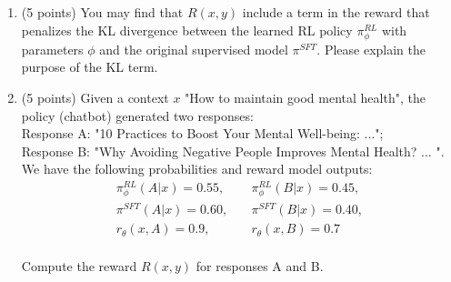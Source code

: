 \begin{enumerate}
\item (5 points) You may find that $R(x, y)$  include a term in the reward that penalizes the KL divergence between the learned RL policy $\pi_{\phi}^{RL}$ with parameters $\phi$ and the original
supervised model $\pi^{SFT}$. Please explain the purpose of the KL term.\\



\item (5 points) Given a context  $x$ "How to maintain good mental health", the policy (chatbot) generated two responses:\\
Response A: "10 Practices to Boost Your Mental Well-being: ...";\\
Response B: "Why Avoiding Negative People Improves Mental Health? ... ".\\
We have the following probabilities and reward model outputs:\\
\begin{align}
    \pi_{\phi}^{RL}(A|x) = 0.55, & \quad \pi_{\phi}^{RL}(B|x) = 0.45, \\\nonumber
    \pi^{SFT}(A|x) = 0.60, & \quad \pi^{SFT}(B|x) = 0.40 ,\\\nonumber
    r_\theta(x, A) = 0.9, & \quad  r_\theta(x, B) = 0.7 \\\nonumber  
\end{align}

Compute the reward $R(x,y)$ for responses A and B.\\





\end{enumerate}
